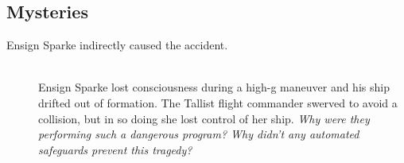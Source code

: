 \documentclass[11pt, a5paper, parskip=half-, DIV=12]{scrartcl}
\begin{document}
\subsection*{Mysteries}
\begin{description}
	\item[Ensign Sparke indirectly caused the accident.] \phantom{a} \\ %
	 Ensign Sparke lost consciousness during a high-g maneuver and his ship drifted out of formation.  The Tallist flight commander swerved to avoid a collision, but in so doing she lost control of her ship. \textit{Why were they performing such a dangerous program? Why didn't any automated safeguards prevent this tragedy?}
\end{description}
\end{document}

